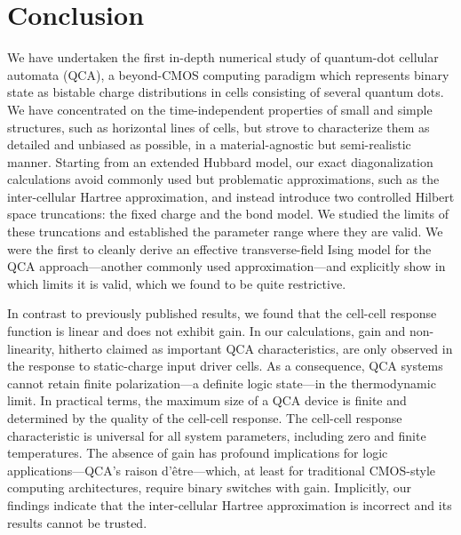 \chapter{Conclusion}

We have undertaken the first in-depth numerical study of quantum-dot cellular
automata (QCA), a beyond-CMOS computing paradigm which represents binary state
as bistable charge distributions in cells consisting of several quantum dots. We
have concentrated on the time-independent properties of small and simple
structures, such as horizontal lines of cells, but strove to characterize them
as detailed and unbiased as possible, in a material-agnostic but semi-realistic
manner. Starting from an extended Hubbard model, our exact diagonalization
calculations avoid commonly used but problematic approximations, such as the
inter-cellular Hartree approximation, and instead introduce two controlled
Hilbert space truncations: the fixed charge and the bond model. We studied the
limits of these truncations and established the parameter range where they are
valid. We were the first to cleanly derive an effective transverse-field Ising
model for the QCA approach---another commonly used approximation---and
explicitly show in which limits it is valid, which we found to be quite
restrictive.

In contrast to previously published results, we found that the cell-cell response
function is linear and does not exhibit gain. In our calculations, gain and
non-linearity, hitherto claimed as important QCA characteristics, are only
observed in the response to static-charge input driver cells. As a consequence,
QCA systems cannot retain finite polarization---a definite logic state---in the
thermodynamic limit. In practical terms, the maximum size of a QCA device is
finite and determined by the quality of the cell-cell response. The cell-cell
response characteristic is universal for all system parameters, including zero
and finite temperatures. The absence of gain has profound implications for logic
applications---QCA's raison d'\^etre---which, at least for traditional CMOS-style
computing architectures, require binary switches with gain. Implicitly, our
findings indicate that the inter-cellular Hartree approximation is incorrect
and its results cannot be trusted.

